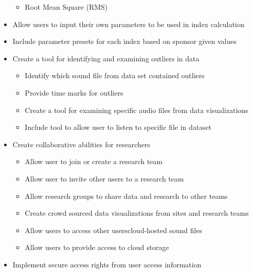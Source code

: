 \begin{itemize}
\begin{itemize}
      \item Root Mean Square (RMS)
    \end{itemize}
  \item Allow users to input their own parameters to be used in index calculation
  \item Include parameter presets for each index based on sponsor given values
  \item Create a tool for identifying and examining outliers in data
    \begin{itemize}
      \item Identify which sound file from data set contained outliers
      \item Provide time marks for outliers
      \item Create a tool for examining specific audio files from data visualizations
      \item Include tool to allow user to listen to specific file in dataset
    \end{itemize}
  \item Create collaborative abilities for researchers
    \begin{itemize}
      \item Allow user to join or create a research team
      \item Allow user to invite other users to a research team
      \item Allow research groups to share data and research to other teams
      \item Create crowd sourced data visualizations from sites and research teams
      \item Allow users to access other users\textquotesingle cloud-hosted sound files
      \item Allow users to provide access to cloud storage
    \end{itemize}
  \item Implement secure access rights from user access information
\end{itemize}
